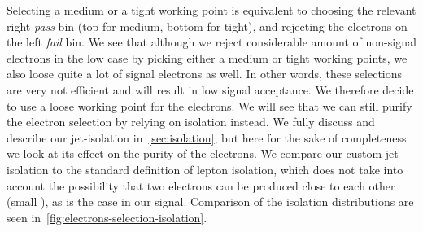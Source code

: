 Selecting a medium or a tight working point is equivalent to choosing the relevant right \emph{pass} bin (top for medium, bottom for tight), and rejecting the electrons on the left \emph{fail} bin. We see that although we reject considerable amount of non-signal electrons in the low \dm case by picking either a medium or tight working points, we also loose quite a lot of signal electrons as well. In other words, these selections are very not efficient and will result in low signal acceptance. We therefore decide to use a loose working point for the electrons. We will see that we can still purify the electron selection by relying on isolation instead. We fully discuss and describe our jet-isolation in~\ref{sec:isolation}, but here for the sake of completeness we look at its effect on the purity of the electrons. We compare our custom jet-isolation to the standard definition of lepton isolation, which does not take into account the possibility that two electrons can be produced close to each other (small \DR), as is the case in our signal. Comparison of the isolation distributions are seen in~\ref{fig:electrons-selection-isolation}.

